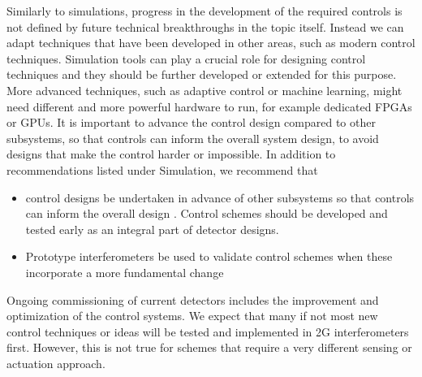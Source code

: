 Similarly to simulations, progress in the development of the required controls is not defined by future technical breakthroughs in the topic itself. Instead we can adapt techniques that have been developed in other areas, such as modern control techniques. Simulation tools can play a crucial role for designing control techniques and they should be further developed or extended for this purpose. More advanced techniques, such as adaptive control or machine learning, might need different and more powerful hardware to run, for example dedicated FPGAs or GPUs. It is important to advance the control design compared to other subsystems, so that controls can inform the overall system design, to avoid designs that make the control harder or impossible. 
In addition to recommendations listed under Simulation, we recommend that
\begin{itemize}
\item control designs be undertaken in advance of other subsystems so that controls can inform the overall design .  Control schemes should be developed and tested early as an integral part of detector designs.
\item Prototype interferometers be used to validate control schemes when these incorporate a more fundamental change
\end{itemize}

Ongoing commissioning of current detectors includes the improvement and optimization of the control systems. We expect that many if not most new control techniques or ideas will be tested and implemented in 2G interferometers first. However, this is not true for schemes that require a very different sensing or actuation approach. 


